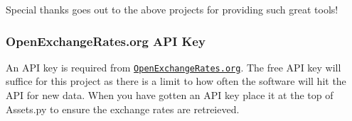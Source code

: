 Special thanks goes out to the above projects for providing such great tools!

\subsubsection*{Open\-Exchange\-Rates.\-org A\-P\-I Key}

An A\-P\-I key is required from \href{https://openexchangerates.org/signup/free}{\tt Open\-Exchange\-Rates.\-org}. The free A\-P\-I key will suffice for this project as there is a limit to how often the software will hit the A\-P\-I for new data. When you have gotten an A\-P\-I key place it at the top of Assets.\-py to ensure the exchange rates are retreieved. 